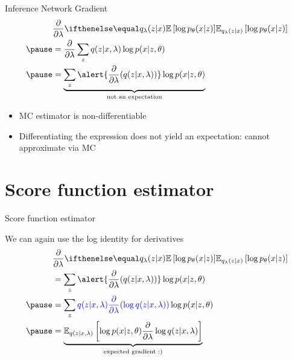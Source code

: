 \begin{frame}{Inference Network Gradient}
\begin{equation*}
\begin{aligned}
&\pdv{\lambda}\E[q_\lambda(z|x)]{\log p_\theta(x|z)} \\ \pause
&= \pdv{\lambda} \sum_z q(z|x,\lambda)\log p(x|z, \theta)  \\ \pause
&=  \underbrace{\sum_z \alert{\pdv{\lambda}(q(z|x, \lambda))} \log p(x|z, \theta)}_{\text{not an expectation}} 
\end{aligned}
\end{equation*}

\pause

\begin{itemize}
	\item MC estimator is non-differentiable \\ \pause
	\item Differentiating the expression does not yield an expectation: cannot approximate via MC
\end{itemize}

\end{frame}


\section{Score function estimator}

\begin{frame}{Score function estimator}

We can again use the log identity for derivatives
\vspace{-5pt}
\begin{equation*}
\begin{aligned}
&\pdv{\lambda}\E[q_\lambda(z|x)]{\log p_\theta(x|z)} \\ 
&=  \sum_z \alert{\pdv{\lambda}(q(z|x, \lambda))} \log p(x|z, \theta) \\  \pause
&= \sum_z \textcolor{blue}{q(z|x, \lambda) \pdv{\lambda}(\log q(z|x, \lambda))} \log p(x|z, \theta)  \\ \pause
&= \underbrace{\mathbb E_{q(z|x, \lambda)} \left[  \log p(x|z, \theta)  \pdv{\lambda}\log q(z|x, \lambda)\right]}_{\text{expected gradient :)}}
\end{aligned}
\end{equation*}


\end{frame}

